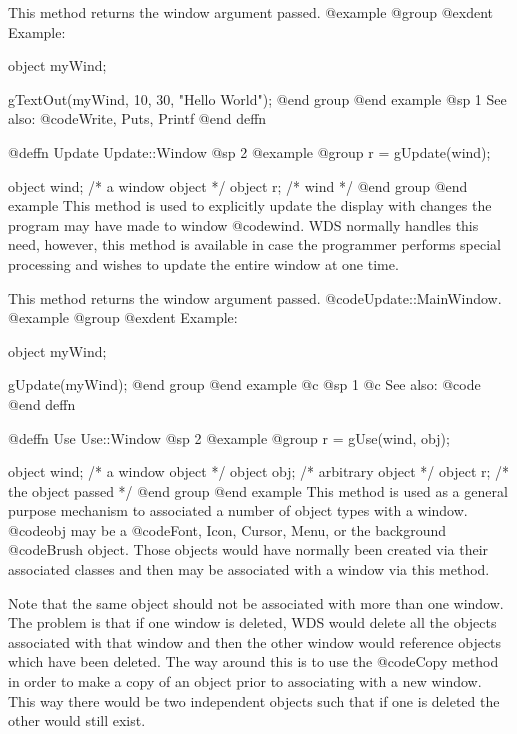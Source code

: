 This method returns the window argument passed.
@example
@group
@exdent Example:

object  myWind;

gTextOut(myWind, 10, 30, "Hello World");
@end group
@end example
@sp 1
See also:  @code{Write, Puts, Printf}
@end deffn









@deffn {Update} Update::Window
@sp 2
@example
@group
r = gUpdate(wind);

object  wind;   /*  a window object     */
object  r;      /*  wind                */
@end group
@end example
This method is used to explicitly update the display with changes the program
may have made to window @code{wind}.  WDS normally handles this need, however,
this method is available in case the programmer performs special processing
and wishes to update the entire window at one time.

This method returns the window argument passed.
@code{Update::MainWindow}.
@example
@group
@exdent Example:

object  myWind;

gUpdate(myWind);
@end group
@end example
@c @sp 1
@c See also:  @code{}
@end deffn









@deffn {Use} Use::Window
@sp 2
@example
@group
r = gUse(wind, obj);

object  wind;   /*  a window object     */
object  obj;    /*  arbitrary object    */
object  r;      /*  the object passed   */
@end group
@end example
This method is used as a general purpose mechanism to associated a
number of object types with a window.  @code{obj} may be a @code{Font,
Icon, Cursor, Menu,} or the background @code{Brush} object.  Those
objects would have normally been created via their associated classes
and then may be associated with a window via this method.

Note that the same object should not be associated with more than one
window.  The problem is that if one window is deleted, WDS would delete
all the objects associated with that window and then the other window
would reference objects which have been deleted.  The way around this is
to use the @code{Copy} method in order to make a copy of an object prior
to associating with a new window.  This way there would be two
independent objects such that if one is deleted the other would still
exist.


